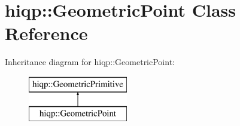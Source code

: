 \hypertarget{classhiqp_1_1GeometricPoint}{\section{hiqp\-:\-:Geometric\-Point Class Reference}
\label{classhiqp_1_1GeometricPoint}
}
Inheritance diagram for hiqp\-:\-:Geometric\-Point\-:\begin{figure}[H]
\begin{center}
\leavevmode
\includegraphics[height=2.000000cm]{classhiqp_1_1GeometricPoint}
\end{center}
\end{figure}
